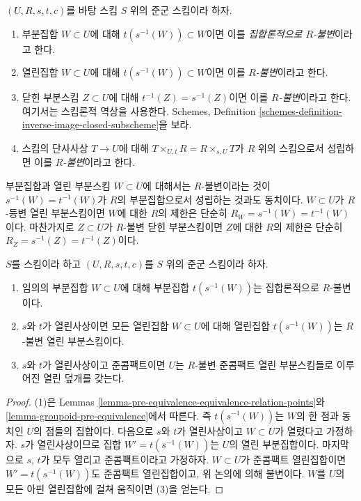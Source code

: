 \begin{definition}
\label{definition-invariant-open}
$(U, R, s, t, c)$를 바탕 스킴 $S$ 위의 준군 스킴이라 하자.
\begin{enumerate}
\item 부분집합 $W \subset U$에 대해 $t(s^{-1}(W)) \subset W$이면 이를 {\it 집합론적으로 $R$-불변}이라고 한다.
\item 열린집합 $W \subset U$에 대해 $t(s^{-1}(W)) \subset W$이면 이를 {\it $R$-불변}이라고 한다.
\item 닫힌 부분스킴 $Z \subset U$에 대해 $t^{-1}(Z) = s^{-1}(Z)$이면 이를 {\it $R$-불변}이라고 한다.
여기서는 스킴론적 역상을 사용한다. Schemes, Definition \ref{schemes-definition-inverse-image-closed-subscheme}을 보라.
\item 스킴의 단사사상 $T \to U$에 대해 $T \times_{U, t} R = R \times_{s, U} T$가 $R$ 위의 스킴으로서
성립하면 이를 {\it $R$-불변}이라고 한다.
\end{enumerate}
\end{definition}

\noindent
부분집합과 열린 부분스킴 $W \subset U$에 대해서는 $R$-불변이라는 것이 $s^{-1}(W) = t^{-1}(W)$가 $R$의
부분집합으로서 성립하는 것과도 동치이다. $W \subset U$가 $R$-등변 열린 부분스킴이면 $W$에 대한 $R$의 제한은
단순히 $R_W = s^{-1}(W) = t^{-1}(W)$이다. 마찬가지로 $Z \subset U$가 $R$-불변 닫힌 부분스킴이면
$Z$에 대한 $R$의 제한은 단순히 $R_Z = s^{-1}(Z) = t^{-1}(Z)$이다.

\begin{lemma}
\label{lemma-constructing-invariant-opens}
$S$를 스킴이라 하고 $(U, R, s, t, c)$를 $S$ 위의 준군 스킴이라 하자.
\begin{enumerate}
\item 임의의 부분집합 $W \subset U$에 대해 부분집합 $t(s^{-1}(W))$는 집합론적으로 $R$-불변이다.
\item $s$와 $t$가 열린사상이면 모든 열린집합 $W \subset U$에 대해 열린집합 $t(s^{-1}(W))$는
$R$-불변 열린 부분스킴이다.
\item $s$와 $t$가 열린사상이고 준콤팩트이면 $U$는 $R$-불변 준콤팩트 열린 부분스킴들로 이루어진 열린 덮개를 갖는다.
\end{enumerate}
\end{lemma}

\begin{proof}
(1)은 Lemmas \ref{lemma-pre-equivalence-equivalence-relation-points}와
\ref{lemma-groupoid-pre-equivalence}에서 따른다. 즉 $t(s^{-1}(W))$는 $W$의 한 점과 동치인 $U$의 점들의 집합이다.
다음으로 $s$와 $t$가 열린사상이고 $W \subset U$가 열렸다고 가정하자. $s$가 열린사상이므로 집합
$W' = t(s^{-1}(W))$는 $U$의 열린 부분집합이다. 마지막으로 $s$, $t$가 모두 열리고 준콤팩트이라고 가정하자.
$W \subset U$가 준콤팩트 열린집합이면 $W' = t(s^{-1}(W))$도 준콤팩트 열린집합이고, 위 논의에 의해 불변이다.
$W$를 $U$의 모든 아핀 열린집합에 걸쳐 움직이면 (3)을 얻는다.
\end{proof}

